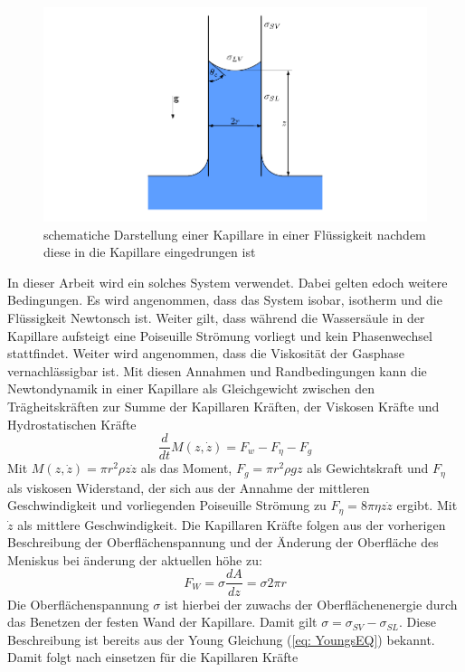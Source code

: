\begin{figure}[h]
    \centering
    \includegraphics[width=.95\textwidth]{Pictures/classicCapillary.pdf}
    \caption{schematiche Darstellung einer Kapillare in einer Flüssigkeit nachdem diese in die Kapillare eingedrungen ist}
    \label{fig: classicCapillary}
\end{figure}
In dieser Arbeit wird ein solches System verwendet. Dabei gelten edoch weitere Bedingungen. Es wird angenommen, dass das System isobar, isotherm und die Flüssigkeit Newtonsch ist. Weiter gilt, dass während die Wassersäule in der Kapillare aufsteigt eine Poiseuille Strömung vorliegt und kein Phasenwechsel stattfindet. Weiter wird angenommen, dass die Viskosität der Gasphase vernachlässigbar ist. Mit diesen Annahmen und Randbedingungen kann die Newtondynamik in einer Kapillare als Gleichgewicht zwischen den Trägheitskräften zur Summe der Kapillaren Kräften, der Viskosen Kräfte und Hydrostatischen Kräfte \cite{fricke2023AnalyticalStudyCapillary}
\begin{equation}
\label{eq: NewtonBalanceForcesOnly}
    \frac{d}{dt}M(z,\dot{z}) = F_w - F_{\eta} - F_g
\end{equation}
Mit $M(z,\dot{z}) = \pi r^2 \rho z \dot{z}$ als das Moment, $F_g = \pi r^2 \rho g z$ als Gewichtskraft und $F_{\eta}$ als viskosen Widerstand, der sich aus der Annahme der mittleren Geschwindigkeit und vorliegenden Poiseuille Strömung zu $F_{\eta}=8\pi\eta z \dot{z}$ ergibt. Mit $\dot{z}$ als mittlere Geschwindigkeit. Die Kapillaren Kräfte folgen aus der vorherigen Beschreibung der Oberflächenspannung und der Änderung der Oberfläche des Meniskus bei änderung der aktuellen höhe zu:
\begin{equation}
    F_W=\sigma \frac{dA}{dz} = \sigma 2\pi r
\end{equation}
Die Oberflächenspannung $\sigma$ ist hierbei der zuwachs der Oberflächenenergie durch das Benetzen der festen Wand der Kapillare. Damit gilt $\sigma = \sigma_{SV}- \sigma_{SL}$. Diese Beschreibung ist bereits aus der Young Gleichung (\ref{eq: YoungsEQ}) bekannt. Damit folgt nach einsetzen für die Kapillaren Kräfte
